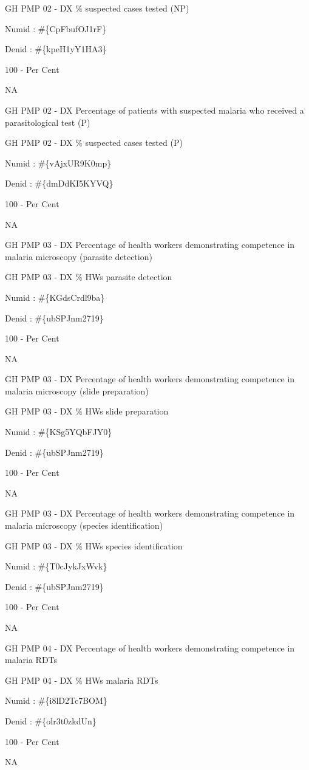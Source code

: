 \documentclass[]{book}
\begin{document}
GH PMP 02 - DX \% suspected cases tested (NP)

Numid : \#\{CpFbufOJ1rF\}

Denid : \#\{kpeH1yY1HA3\}

100 - Per Cent

NA

GH PMP 02 - DX Percentage of patients with suspected malaria who received a parasitological test (P)

GH PMP 02 - DX \% suspected cases tested (P)

Numid : \#\{vAjxUR9K0mp\}

Denid : \#\{dmDdKI5KYVQ\}

100 - Per Cent

NA

GH PMP 03 - DX Percentage of health workers demonstrating competence in malaria microscopy (parasite detection)

GH PMP 03 - DX \% HWs parasite detection

Numid : \#\{KGdsCrdl9ba\}

Denid : \#\{ubSPJnm2719\}

100 - Per Cent

NA

GH PMP 03 - DX Percentage of health workers demonstrating competence in malaria microscopy (slide preparation)

GH PMP 03 - DX \% HWs slide preparation

Numid : \#\{KSg5YQbFJY0\}

Denid : \#\{ubSPJnm2719\}

100 - Per Cent

NA

GH PMP 03 - DX Percentage of health workers demonstrating competence in malaria microscopy (species identification)

GH PMP 03 - DX \% HWs species identification

Numid : \#\{T0cJykJxWvk\}

Denid : \#\{ubSPJnm2719\}

100 - Per Cent

NA

GH PMP 04 - DX Percentage of health workers demonstrating competence in malaria RDTs

GH PMP 04 - DX \% HWs malaria RDTs

Numid : \#\{i8lD2Tc7BOM\}

Denid : \#\{olr3t0zkdUn\}

100 - Per Cent

NA
\end{document}
